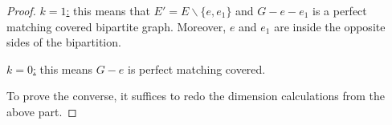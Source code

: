 \documentclass[10pt,a4paper]{amsart}
\begin{document}
\begin{proof}
    \underline{$k=1$:} this means that $E'=E\backslash\{e, e_1\}$ and $G-e-e_1$ is a perfect matching covered bipartite graph. Moreover, $e$ and $e_1$ are inside the opposite sides of the bipartition.

    \underline{$k=0$:} this means $G-e$ is perfect matching covered.

    To prove the converse, it suffices to redo the dimension calculations from the above part.
\end{proof}
\end{document}
